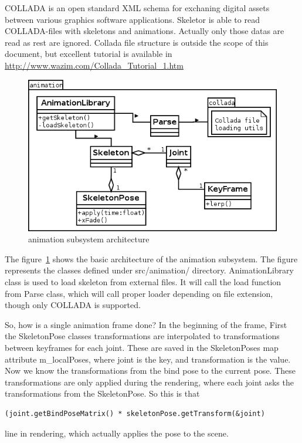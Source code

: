 \documentclass[11pt,twoside,a4paper]{article}
\begin{document}
COLLADA is an open standard XML schema for exchaning digital assets between various graphics software applications. Skeletor is able to read COLLADA-files with skeletons and animations. Actually only those datas are read as rest are ignored. Collada file structure is outside the scope of this document, but excellent tutorial is available in \url{http://www.wazim.com/Collada_Tutorial_1.htm}

\begin{figure}
  \centering
    \includegraphics[scale=0.7]{animation_subsystem.png}
  \caption{animation subsystem architecture}
  \label{animsubsys}
\end{figure}

The figure~\ref{animsubsys} shows the basic architecture of the animation subsystem. The figure represents the classes defined under src/animation/ directory. AnimationLibrary class is used to load skeleton from external files. It will call the load function from Parse class, which will call proper loader depending on file extension, though only COLLADA is supported.

So, how is a single animation frame done? In the beginning of the frame, First the SkeletonPose classes transformations are interpolated to transformations between keyframes for each joint. These are saved in the SkeletonPoses map attribute m\_localPoses, where joint is the key, and transformation is the value. Now we know the transformations from the bind pose to the current pose. These transformations are only applied during the rendering, where each joint asks the transformations from the SkeletonPose. So this is that \begin{verbatim}(joint.getBindPoseMatrix() * skeletonPose.getTransform(&joint)\end{verbatim} line in rendering, which actually applies the pose to the scene.
\end{document}
